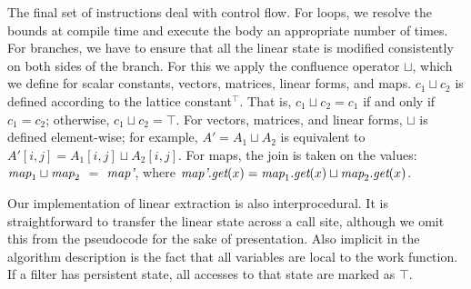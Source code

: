 The final set of instructions deal with control flow.  For loops, we
resolve the bounds at compile time and execute the body an appropriate
number of times.  For branches, we have to ensure that all the linear
state is modified consistently on both sides of the branch.  For this
we apply the confluence operator $\sqcup$, which we define for scalar
constants, vectors, matrices, linear forms, and maps.  $c_1 \sqcup
c_2$ is defined according to the lattice constant$^{\top}$.  That is,
$c_1 \sqcup c_2 = c_1$ if and only if $c_1 = c_2$; otherwise, $c_1
\sqcup c_2 = \top$.  For vectors, matrices, and linear forms, $\sqcup$
is defined element-wise; for example, $A' = A_1 \sqcup A_2$ is
equivalent to $A'[i,j] = A_1[i,j] \sqcup A_2[i,j]$.  For maps, the
join is taken on the values: $\mbox{\it map}_1 \sqcup \mbox{\it map}_2$ $=$
$\mbox{\it map'}$, where $\mbox{\it map'}.\mbox{\it get}(x) = \mbox{\it map}_1.\mbox{\it get}(x)
\sqcup \mbox{\it map}_2.\mbox{\it get}(x)$.

Our implementation of linear extraction is also interprocedural.  It
is straightforward to transfer the linear state across a call site,
although we omit this from the pseudocode for the sake of
presentation.  Also implicit in the algorithm description is the fact
that all variables are local to the work function.  If a filter
has persistent state, all accesses to that state are marked as $\top$.
